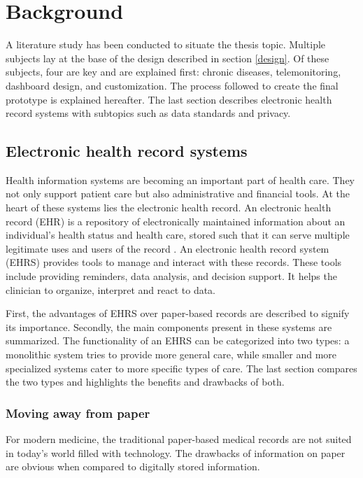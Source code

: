 \section{Background} \label{background}

A literature study has been conducted to situate the thesis topic. Multiple subjects lay at the base of the design described in section \ref{design}. Of these subjects, four are key and are explained first: chronic diseases, telemonitoring, dashboard design, and customization. The process followed to create the final prototype is explained hereafter. The last section describes electronic health record systems with subtopics such as data standards and privacy.

    \subsection{Electronic health record systems}

    Health information systems are becoming an important part of health care. They not only support patient care but also administrative and financial tools. At the heart of these systems lies the electronic health record. An electronic health record (EHR) is a repository of electronically maintained information about an individual's health status and health care, stored such that it can serve multiple legitimate uses and users of the record \cite{biomedical_informatics}. An electronic health record system (EHRS) provides tools to manage and interact with these records. These tools include providing reminders, data analysis, and decision support. It helps the clinician to organize, interpret and react to data.

    First, the advantages of EHRS over paper-based records are described to signify its importance. Secondly, the main components present in these systems are summarized. The functionality of an EHRS can be categorized into two types: a monolithic system tries to provide more general care, while smaller and more specialized systems cater to more specific types of care. The last section compares the two types and highlights the benefits and drawbacks of both.

        \subsubsection{Moving away from paper} \label{2_ehrs_paper}

        For modern medicine, the traditional paper-based medical records are not suited in today's world filled with technology. The drawbacks of information on paper are obvious when compared to digitally stored information.

